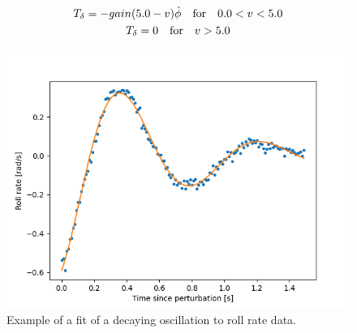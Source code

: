 \documentclass[12pt]{article}
\begin{document}
\begin{gather}
    T_{\delta} = -gain(5.0 - v)\Dot{\phi} \quad \textnormal{for} \quad  0.0 < v < 5.0 \\
    T_{\delta} = 0 \quad \textnormal{for} \quad v > 5.0
\end{gather}

\begin{figure}[h]
    \centering
    \includegraphics[width=\columnwidth]{figures/example_roll_rate_fit.png}
    \caption{Example of a fit of a decaying oscillation to roll rate data.} \label{example-roll-rate-fit}
\end{figure}
\end{document}
